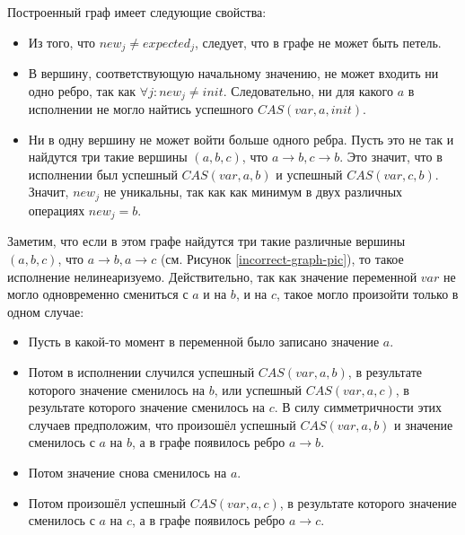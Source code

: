 \documentclass[times,specification,annotation]{itmo-student-thesis}
\begin{document}
Построенный граф имеет следующие свойства:


\begin{itemize}
    \item Из того, что $new_j \ne expected_j$, следует, что в графе не может быть петель. 
    
    \item В вершину, соответствующую начальному значению, не может входить ни одно ребро, так как $\forall j: new_j \ne init$. Следовательно, ни для какого $a$ в исполнении не могло найтись успешного $CAS(var, a, init)$.
    
    \item Ни в одну вершину не может войти больше одного ребра. Пусть это не так и найдутся три такие вершины $(a, b, c)$, что $a \rightarrow b, c \rightarrow b$. Это значит, что в исполнении был успешный $CAS(var, a, b)$ и успешный $CAS(var, c, b)$. Значит,  $new_j$ не уникальны, так как как минимум в двух различных операциях  $new_j = b$. 
\end{itemize}

\bigbreak

Заметим, что если в этом графе найдутся три такие различные вершины $(a, b, c)$, что $a \rightarrow b, a \rightarrow c$ (см. Рисунок \ref{incorrect-graph-pic}), то такое исполнение нелинеаризуемо. Действительно, так как значение переменной $var$ не могло одновременно смениться с $a$ и на $b$, и на $c$, такое могло произойти только в одном случае:

\begin{itemize}
    \item Пусть в какой-то момент в переменной было записано значение $a$.
    
    \item Потом в исполнении случился успешный $CAS(var, a, b)$, в результате которого значение сменилось на $b$, или успешный $CAS(var, a, c)$, в результате которого значение сменилось на $c$. В силу симметричности этих случаев предположим, что произошёл успешный $CAS(var, a, b)$ и значение сменилось с $a$ на $b$, а в графе появилось ребро $a \rightarrow b$.
    
    \item Потом значение снова сменилось на $a$.
    
    \item Потом произошёл успешный $CAS(var, a, c)$, в результате которого значение сменилось с $a$ на $c$, а в графе появилось ребро $a \rightarrow c$.
\end{itemize}
\end{document}
